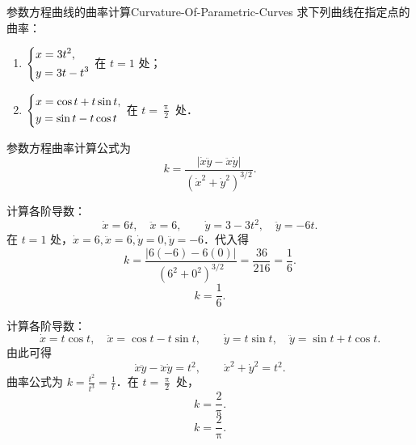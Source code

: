 \begin{problem}{参数方程曲线的曲率计算}{Curvature-Of-Parametric-Curves}
    求下列曲线在指定点的曲率：
    \begin{enumerate}
        \item $\begin{dcases} x = 3t^2, \\ y = 3t - t^3 \end{dcases}$ 在 $t = 1$ 处；
        \item $\begin{dcases} x = \cos t + t\sin t, \\ y = \sin t - t\cos t \end{dcases}$ 在 $t = \frac{\uppi}{2}$ 处．
    \end{enumerate}
\end{problem}

\begin{solution}
    参数方程曲率计算公式为
    \begin{equation}
        k = \frac{|\dot{x}\ddot{y} - \ddot{x}\dot{y}|}{(\dot{x}^2 + \dot{y}^2)^{3/2}}.
    \end{equation}


    计算各阶导数：
    \begin{equation}
        \dot{x} = 6t, \quad \ddot{x} = 6, \qquad \dot{y} = 3 - 3t^2, \quad \ddot{y} = -6t.
    \end{equation}
    在 $t = 1$ 处，$\dot{x} = 6, \ddot{x} = 6, \dot{y} = 0, \ddot{y} = -6$．代入得
    \begin{equation}
        k = \frac{|6(-6) - 6(0)|}{(6^2 + 0^2)^{3/2}} = \frac{36}{216} = \frac{1}{6}.
    \end{equation}
    \begin{equation}
        \boxed{k = \frac{1}{6}.}
    \end{equation}


    计算各阶导数：
    \begin{equation}
        \dot{x} = t\cos t, \quad \ddot{x} = \cos t - t\sin t, \qquad \dot{y} = t\sin t, \quad \ddot{y} = \sin t + t\cos t.
    \end{equation}
    由此可得
    \begin{equation}
        \dot{x}\ddot{y} - \ddot{x}\dot{y} = t^2, \qquad \dot{x}^2 + \dot{y}^2 = t^2.
    \end{equation}
    曲率公式为 $k = \frac{t^2}{t^3} = \frac{1}{t}$．在 $t = \frac{\uppi}{2}$ 处，
    \begin{equation}
        k = \frac{2}{\uppi}.
    \end{equation}
    \begin{equation}
        \boxed{k = \frac{2}{\uppi}.}
    \end{equation}
\end{solution}

